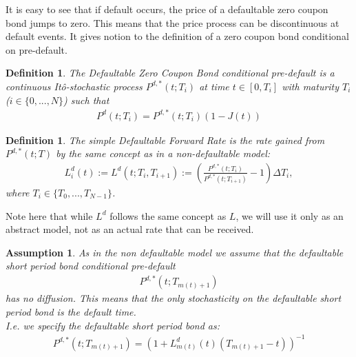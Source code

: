 \documentclass[12pt]{article}
\newtheorem{assumption}{Assumption}[section]
\newtheorem{definition}[theorem]{Definition}
\begin{document}
	It is easy to see that if default occurs, the price of a defaultable zero coupon bond jumps to zero. This means that the price process can be discontinuous at default events. It gives notion to the definition of a zero coupon bond conditional on pre-default.
	\begin{definition}
		The \emph{Defaultable Zero Coupon Bond conditional pre-default} is a continuous Itô-stochastic process \(P^{d,*}(t; T_i)\) at time \(t \in \left[0, T_i\right]\) with maturity $T_i$ ($i \in \{0, ..., N\}$) such that
		\begin{align*}
			P^{d}(t; T_i) = P^{d,*}(t; T_i)(1 - J(t))
		\end{align*}
	\end{definition}
	\begin{definition}
		The \emph{simple Defaultable Forward Rate} is the rate gained from \(P^{d,*}(t; T)\) by the same concept as in a non-defaultable model:
		\begin{align}\label{defLIBOR}
		L^{d}_i(t) := L^{d}(t; T_i, T_{i+1}) := \left( \frac{P^{d,*}(t; T_i)}{P^{d,*}(t; T_{i+1})} - 1\right) \Delta T_i,
		\end{align}
		where \(T_i \in \{T_0, ..., T_{N-1}\}\).
	\end{definition}
	Note here that while $L^d$ follows the same concept as $L$, we will use it only as an abstract model, not as an actual rate that can be received.
	
	\begin{assumption}
		\label{as:DLMMShortPeriodBond}
		As in the non defaultable model we assume that the defaultable short period bond conditional pre-default
		\begin{align*}
			P^{d,*}(t;T_{m(t)+1})
		\end{align*}
		has no diffusion. This means that the only stochasticity on the defaultable short period bond is the default time.\\
		I.e. we specify the defaultable short period bond as:
		\begin{align*}
			P^{d,*}(t;T_{m(t)+1}) = (1 + L^d_{m(t)}(t)(T_{m(t)+1} - t))^{-1}
		\end{align*}
	\end{assumption}
	
\end{document}

